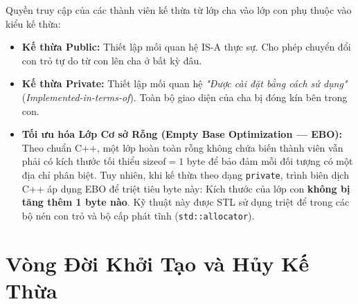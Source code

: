 \documentclass[12pt,a4paper,oneside]{book}
\begin{document}
Quyền truy cập của các thành viên kế thừa từ lớp cha vào lớp con phụ thuộc vào kiểu kế thừa:

\begin{table}[htbp]
\centering
\caption{Ma trận biến đổi quyền truy cập các trường dữ liệu trong kế thừa}
\vspace{0.2cm}
\end{table}

\begin{itemize}
    \item \textbf{Kế thừa Public:} Thiết lập mối quan hệ IS-A thực sự. Cho phép chuyển đổi con trỏ tự do từ con lên cha ở bất kỳ đâu.
    \item \textbf{Kế thừa Private:} Thiết lập mối quan hệ \textit{"Được cài đặt bằng cách sử dụng"} (\textit{Implemented-in-terms-of}). Toàn bộ giao diện của cha bị đóng kín bên trong con.
    \item \textbf{Tối ưu hóa Lớp Cơ sở Rỗng (Empty Base Optimization --- EBO):}
    Theo chuẩn C++, một lớp hoàn toàn rỗng không chứa biến thành viên vẫn phải có kích thước tối thiểu $\text{sizeof} = 1$ byte để bảo đảm mỗi đối tượng có một địa chỉ phân biệt. Tuy nhiên, khi kế thừa theo dạng \texttt{private}, trình biên dịch C++ áp dụng EBO để triệt tiêu byte này: Kích thước của lớp con \textbf{không bị tăng thêm 1 byte nào}. Kỹ thuật này được STL sử dụng triệt để trong các bộ nén con trỏ và bộ cấp phát tĩnh (\texttt{std::allocator}).
\end{itemize}

\section{Vòng Đời Khởi Tạo và Hủy Kế Thừa}
\end{document}
